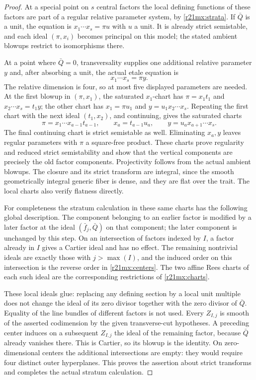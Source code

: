 \begin{proof}
At a special point on $s$ central factors the local defining functions
of these factors are part of a regular relative parameter system,
by \eqref{r21mx:strata}.  If $\bar Q$ is a unit, the equation is
$x_1\cdots x_s=\pi u$ with $u$ a unit.  It is already strict
semistable, and each ideal $(\pi,x_i)$ becomes principal on this
model; the stated ambient blowups restrict to isomorphisms there.

At a point where $\bar Q=0$, transversality supplies one additional
relative parameter $y$ and, after absorbing a unit, the actual etale
equation is
\[
                         x_1\cdots x_s=\pi y.
 \tag{MX21.5}\label{r21mx:chart0}
\]
The relative dimension is four, so at most five displayed parameters
are needed.  At the first blowup in $(\pi,x_1)$, the saturated
$x_1$-chart has $\pi=x_1t_1$ and
$x_2\cdots x_s=t_1y$; the other chart has $x_1=\pi u_1$ and
$y=u_1x_2\cdots x_s$.  Repeating the first chart with the next
ideal $(t_1,x_2)$, and continuing, gives the saturated charts
\[
 \pi=x_1\cdots x_{a-1}t_{a-1},\qquad
 x_a=t_{a-1}u_a,\qquad
 y=u_ax_{a+1}\cdots x_s.
 \tag{MX21.6}\label{r21mx:charts}
\]
The final continuing chart is strict semistable as well.  Eliminating
$x_a,y$ leaves regular parameters with $\pi$ a square-free product.
These charts prove regularity and reduced strict semistability and
show that the vertical components are precisely the old factor
components.  Projectivity follows from the actual ambient blowups.
The closure and its strict transform are integral, since the smooth
geometrically integral generic fiber is dense, and they are flat over
the trait.  The local charts also verify flatness directly.

For completeness the stratum calculation in these same charts has
the following global description.  The component belonging to an
earlier factor is modified by a later factor at the ideal
$(\bar f_j,\bar Q)$ on that component; the later component is
unchanged by this step.  On an intersection of factors indexed by
$I$, a factor already in $I$ gives a Cartier ideal and has no effect.
The remaining nontrivial ideals are exactly those with $j>\max(I)$,
and the induced order on this intersection is the reverse order in
\eqref{r21mx:centers}.  The two affine Rees charts of each such ideal
are the corresponding restrictions of \eqref{r21mx:charts}.

These local ideals glue: replacing any defining section by a local
unit multiple does not change the ideal of its zero divisor together
with the zero divisor of $\bar Q$.  Equality of the line bundles of
different factors is not used.  Every $Z_{I,j}$ is smooth of the
asserted codimension by the given transverse-cut hypotheses.  A
preceding center induces on a subsequent $Z_{I,j}$ the ideal of the
remaining factor, because $\bar Q$ already vanishes there.  This is
Cartier, so its blowup is the identity.  On zero-dimensional centers
the additional intersections are empty: they would require four
distinct outer hyperplanes.  This proves the assertion about strict
transforms and completes the actual stratum calculation.
\end{proof}

